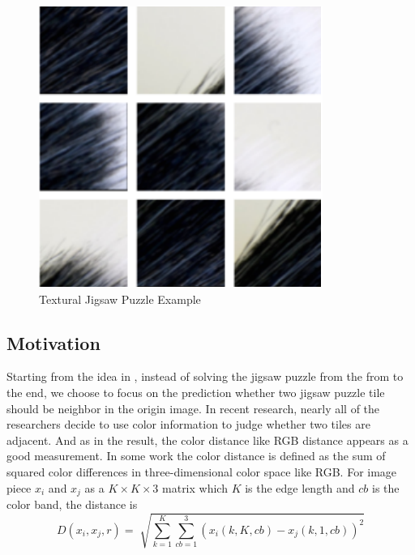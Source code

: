\documentclass{article}
\begin{document}
\begin{figure}
\begin{minipage}{\textwidth}
\begin{minipage}{.49\textwidth}
\begin{minipage}{.49\textwidth}
            \end{minipage}
            \begin{minipage}{.49\textwidth}
                \centering
                \includegraphics[width=\textwidth]{puzzle_texure}
            \end{minipage}
            \caption{Textural Jigsaw Puzzle Example}
            \label{fig:texurejigsawpuzzle}
        \end{minipage}
    \end{minipage}
\end{figure}

\subsection{Motivation}

Starting from the idea in \cite{sholomon2016dnn}, instead of solving the jigsaw puzzle from the from to the end, we choose to focus on the prediction whether two jigsaw puzzle tile should be neighbor in the origin image. In recent research, nearly all of the researchers decide to use color information to judge whether two tiles are adjacent. And as in the result, the color distance like RGB distance appears as a good measurement. In some work\cite{sholomon2013genetic} the color distance is defined as the sum of squared color differences in three-dimensional color space like RGB. For image piece $x_i$ and $x_j$ as a $K\times K\times 3$ matrix which $K$ is the edge length and $cb$ is the color band, the distance is
$$
D(x_i,x_j,r)=\sqrt[]{\sum^K_{k=1}\sum^3_{cb=1}(x_i(k,K,cb)-x_j(k,1,cb))^2}
$$
\end{document}
